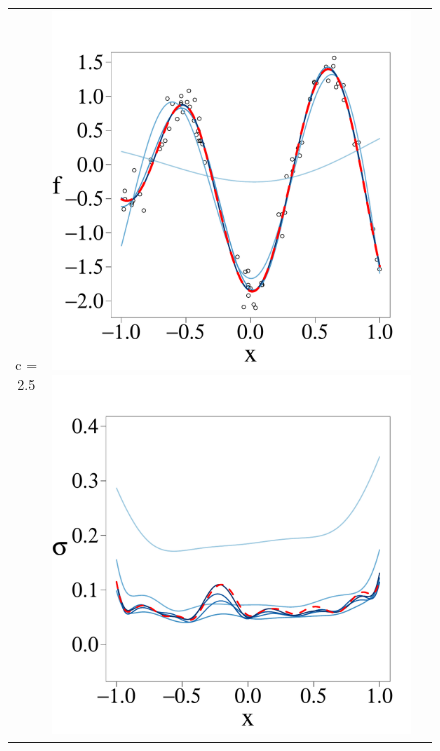\documentclass[onecolumn,a4paper,11pt]{article}
\begin{document}
\begin{figure}
\begin{tabular}{ c c c }
\cline{1-2}
c = 2.5 &
\includegraphics[scale=0.215, trim = 0mm 4mm 0mm 14mm, clip]{ch5_fig3_Post_part6.pdf}
\includegraphics[scale=0.215, trim = 0mm 4mm 0mm 14mm, clip]{ch5_fig3_Sigma_part6.pdf}

\end{tabular}
\end{figure}
\end{document}

